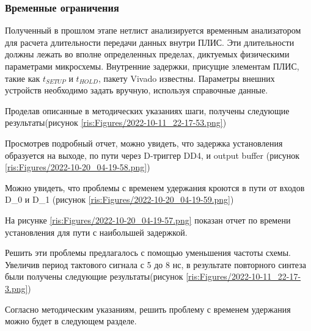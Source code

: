 \begin{sloppypar}
\subsubsection{Временные ограничения} %

Полученный в прошлом этапе нетлист анализируется временным анализатором для расчета длительности передачи данных внутри ПЛИС. Эти длительности должны лежать во вполне определенных пределах, диктуемых физическими параметрами микросхемы. Внутренние задержки, присущие элементам ПЛИС, такие как \begin{math}t_{SETUP}\end{math}  и \begin{math}t_{HOLD}\end{math}, пакету Vivado известны. Параметры внешних устройств необходимо задать вручную, используя справочные данные.

Проделав описанные в методических указаниях шаги, получены следующие результаты(рисунок \ref{ris:Figures/2022-10-11_22-17-53.png})

Просмотрев подробный отчет, можно увидеть, что задержка установления образуется на выходе, по пути через D-триггер DD4, и output buffer (рисунок \ref{ris:Figures/2022-10-20_04-19-58.png})

Можно увидеть, что проблемы с временем удержания кроются в пути от входов D\_0 и D\_1 (рисунок \ref{ris:Figures/2022-10-20_04-19-59.png})

На рисунке \ref{ris:Figures/2022-10-20_04-19-57.png} показан отчет по времени установления для пути с наибольшей задержкой.

Решить эти проблемы предлагалось с помощью уменьшения частоты схемы. Увеличив период тактового сигнала с 5 до 8 нс, в результате повторного синтеза были получены следующие результаты(рисунок \ref{ris:Figures/2022-10-11_22-17-3.png})




Согласно методическим указаниям, решить проблему с временем удержания можно будет в следующем разделе.


\end{sloppypar}
